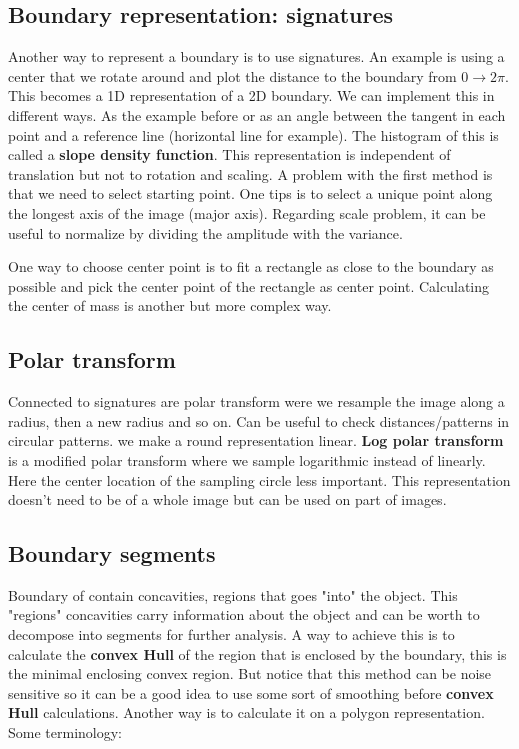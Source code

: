 \subsection*{Boundary representation: signatures}
Another way to represent a boundary is to use signatures. An example is using a center that we rotate around and plot the distance to the boundary from $0 \rightarrow 2\pi$. This becomes a 1D representation of a 2D boundary. We can implement this in different ways. As the example before or as an angle between the tangent in each point and a reference line (horizontal line for example). The histogram of this is called a \textbf{slope density function}. This representation is independent of translation but not to rotation and scaling. A problem with the first method is that we need to select starting point. One tips is to select a unique point along the longest axis of the image (major axis). Regarding scale problem, it can be useful to normalize by dividing the amplitude with the variance. 

\begin{wbox}{}
One way to choose center point is to fit a rectangle as close to the boundary as possible and pick the center point of the rectangle as center point. Calculating the center of mass is another but more complex way. 
\end{wbox}

\subsection*{Polar transform}
Connected to signatures are polar transform were we resample the image along a radius, then a new radius and so on. Can be useful to check distances/patterns in circular patterns. we make a round representation linear. \textbf{Log polar transform} is a modified polar transform where we sample logarithmic instead of linearly. Here the center location of the sampling circle less important. This representation doesn't need to be of a whole image but can be used on part of images. 

\subsection*{Boundary segments}
Boundary of contain concavities, regions that goes "into" the object. This "regions" concavities carry information about the object and can be worth to decompose into segments for further analysis. A way to achieve this is to calculate the \textbf{convex Hull} of the region that is enclosed by the boundary, this is the minimal enclosing convex region. But notice that this method can be noise sensitive so it can be a good idea to use some sort of smoothing before \textbf{convex Hull} calculations. Another way is to calculate it on a polygon representation. Some terminology: 

